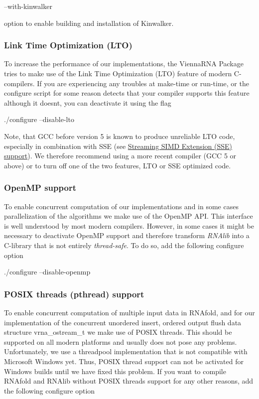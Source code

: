 \begin{DoxyVerb}--with-kinwalker
\end{DoxyVerb}


option to enable building and installation of Kinwalker.\hypertarget{install_config_lto}{}\subsubsection{Link Time Optimization (\+L\+T\+O)}\label{install_config_lto}
To increase the performance of our implementations, the Vienna\+R\+NA Package tries to make use of the Link Time Optimization (L\+TO) feature of modern C-\/compilers. If you are experiencing any troubles at make-\/time or run-\/time, or the configure script for some reason detects that your compiler supports this feature although it doesn\textquotesingle{}t, you can deactivate it using the flag

\begin{DoxyVerb}./configure --disable-lto
\end{DoxyVerb}


Note, that G\+CC before version 5 is known to produce unreliable L\+TO code, especially in combination with S\+SE (see \hyperlink{install_config_sse}{Streaming S\+I\+MD Extension (S\+SE) support}). We therefore recommend using a more recent compiler (G\+CC 5 or above) or to turn off one of the two features, L\+TO or S\+SE optimized code.\hypertarget{install_config_openmp}{}\subsubsection{Open\+M\+P support}\label{install_config_openmp}
To enable concurrent computation of our implementations and in some cases parallelization of the algorithms we make use of the Open\+MP A\+PI. This interface is well understood by most modern compilers. However, in some cases it might be necessary to deactivate Open\+MP support and therefore transform {\itshape R\+N\+Alib} into a C-\/library that is not entirely {\itshape thread-\/safe}. To do so, add the following configure option

\begin{DoxyVerb}./configure --disable-openmp
\end{DoxyVerb}
\hypertarget{install_config_pthread}{}\subsubsection{P\+O\+S\+I\+X threads (pthread) support}\label{install_config_pthread}
To enable concurrent computation of multiple input data in R\+N\+Afold, and for our implementation of the concurrent unordered insert, ordered output flush data structure vrna\+\_\+ostream\+\_\+t we make use of P\+O\+S\+IX threads. This should be supported on all modern platforms and usually does not pose any problems. Unfortunately, we use a threadpool implementation that is not compatible with Microsoft Windows yet. Thus, P\+O\+S\+IX thread support can not be activated for Windows builds until we have fixed this problem. If you want to compile R\+N\+Afold and R\+N\+Alib without P\+O\+S\+IX threads support for any other reasons, add the following configure option

